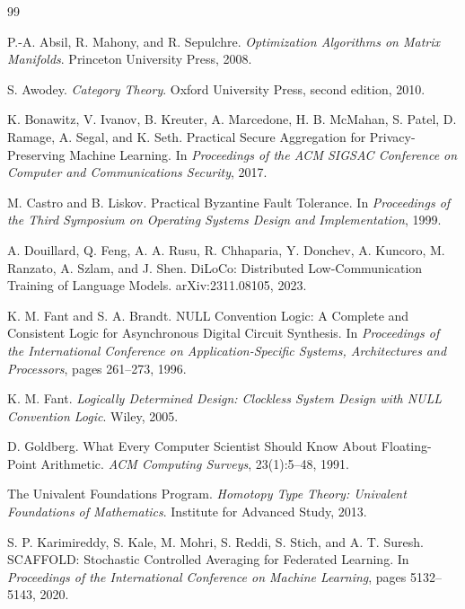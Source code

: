 \documentclass[11pt]{article}
\theoremstyle{definition}
\theoremstyle{remark}
\begin{document}
\begin{thebibliography}{99}

P.-A. Absil, R. Mahony, and R. Sepulchre.
\newblock \emph{Optimization Algorithms on Matrix Manifolds}.
\newblock Princeton University Press, 2008.

S. Awodey.
\newblock \emph{Category Theory}.
\newblock Oxford University Press, second edition, 2010.

K. Bonawitz, V. Ivanov, B. Kreuter, A. Marcedone, H. B. McMahan, S. Patel, D. Ramage, A. Segal, and K. Seth.
\newblock Practical Secure Aggregation for Privacy-Preserving Machine Learning.
\newblock In \emph{Proceedings of the ACM SIGSAC Conference on Computer and Communications Security}, 2017.

M. Castro and B. Liskov.
\newblock Practical Byzantine Fault Tolerance.
\newblock In \emph{Proceedings of the Third Symposium on Operating Systems Design and Implementation}, 1999.

A. Douillard, Q. Feng, A. A. Rusu, R. Chhaparia, Y. Donchev, A. Kuncoro, M. Ranzato, A. Szlam, and J. Shen.
\newblock DiLoCo: Distributed Low-Communication Training of Language Models.
\newblock arXiv:2311.08105, 2023.

K. M. Fant and S. A. Brandt.
\newblock NULL Convention Logic: A Complete and Consistent Logic for Asynchronous Digital Circuit Synthesis.
\newblock In \emph{Proceedings of the International Conference on Application-Specific Systems, Architectures and Processors}, pages 261--273, 1996.

K. M. Fant.
\newblock \emph{Logically Determined Design: Clockless System Design with NULL Convention Logic}.
\newblock Wiley, 2005.

D. Goldberg.
\newblock What Every Computer Scientist Should Know About Floating-Point Arithmetic.
\newblock \emph{ACM Computing Surveys}, 23(1):5--48, 1991.

The Univalent Foundations Program.
\newblock \emph{Homotopy Type Theory: Univalent Foundations of Mathematics}.
\newblock Institute for Advanced Study, 2013.

S. P. Karimireddy, S. Kale, M. Mohri, S. Reddi, S. Stich, and A. T. Suresh.
\newblock SCAFFOLD: Stochastic Controlled Averaging for Federated Learning.
\newblock In \emph{Proceedings of the International Conference on Machine Learning}, pages 5132--5143, 2020.


\end{thebibliography}
\end{document}
